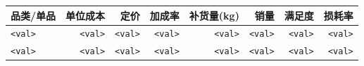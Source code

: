 \begin{tabular}{lrrrrrrr}
\toprule
\textbf{品类/单品} & \textbf{单位成本} & \textbf{定价} & \textbf{加成率} & \textbf{补货量(kg)} & \textbf{销量} & \textbf{满足度} & \textbf{损耗率} \\\midrule
\texttt{<val>} & \texttt{<val>} & \texttt{<val>} & \texttt{<val>} & \texttt{<val>} & \texttt{<val>} & \texttt{<val>} & \texttt{<val>} \\
\texttt{<val>} & \texttt{<val>} & \texttt{<val>} & \texttt{<val>} & \texttt{<val>} & \texttt{<val>} & \texttt{<val>} & \texttt{<val>} \\\bottomrule
\end{tabular}
